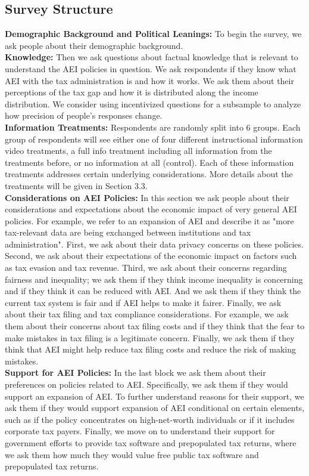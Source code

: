 \documentclass[11pt]{article}
\begin{document}
\subsection{Survey Structure} 
\textbf{Demographic Background and Political Leanings:}
To begin the survey, we ask people about their demographic background. \\[0.5em]
\textbf{Knowledge:}
Then we ask questions about factual knowledge that is relevant to understand the AEI policies in question. We ask respondents if they know what AEI with the tax administration is and how it works. We ask them about their perceptions of the tax gap and how it is distributed along the income distribution. We consider using incentivized questions for a subsample to analyze how precision of people's responses change.  \\[0.5em]
\textbf{Information Treatments:}
Respondents are randomly split into 6 groups. Each group of respondents will see either one of four different instructional information video treatments, a full info treatment including all information from the treatments before, or no information at all (control). Each of these information treatments addresses certain underlying considerations. More details about the treatments will be given in Section 3.3.\\[0.5em]
\textbf{Considerations on AEI Policies:}
In this section we ask people about their considerations and expectations about the economic impact of very general AEI policies. For example, we refer to an expansion of AEI and describe it as "more tax-relevant data are being exchanged between institutions and tax administration". First, we ask about their data privacy concerns on these policies. Second, we ask about their expectations of the economic impact on factors such as tax evasion and tax revenue. Third, we ask about their concerns regarding fairness and inequality; we ask them if they think income inequality is concerning and if they think it can be reduced with AEI. And we ask them if they think the current tax system is fair and if AEI helps to make it fairer. Finally, we ask about their tax filing and tax compliance considerations. For example, we ask them about their concerns about tax filing costs and if they think that the fear to make mistakes in tax filing is a legitimate concern.  Finally, we ask them if they think that AEI might help reduce tax filing costs and reduce the risk of making mistakes. \\[0.5em]
\textbf{Support for AEI Policies:}
In the last block we ask them about their preferences on policies related to AEI. Specifically, we ask them if they would support an expansion of AEI. To further understand reasons for their support, we ask them if they would support expansion of AEI conditional on certain elements, such as if the policy concentrates on high-net-worth individuals or if it includes corporate tax payers. Finally, we move on to understand their support for government efforts to provide tax software and prepopulated tax returns, where we ask them how much they would value free public tax software and prepopulated tax returns. \\[0.5em]
\end{document}
